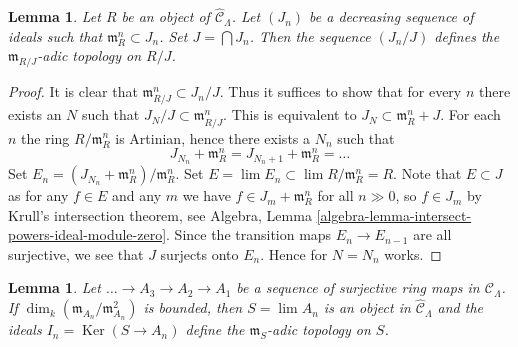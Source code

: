 \documentclass{stacks-project}
\theoremstyle{plain}
\newtheorem{lemma}[subsection]{Lemma}
\theoremstyle{definition}
\theoremstyle{remark}
\numberwithin{equation}{subsection}
\def\lim{\mathop{\mathrm{lim}}\nolimits}
\def\Ker{\mathop{\mathrm{Ker}}}
\begin{document}
\begin{lemma}
\label{lemma-m-adic-topology}
Let $R$ be an object of $\widehat{\mathcal{C}}_\Lambda$. Let $(J_n)$ be a
decreasing sequence of ideals such that $\mathfrak m_R^n \subset J_n$.
Set $J = \bigcap J_n$. Then the sequence $(J_n/J)$ defines the
$\mathfrak m_{R/J}$-adic topology on $R/J$.
\end{lemma}

\begin{proof}
It is clear that $\mathfrak m_{R/J}^n \subset J_n/J$. Thus it suffices
to show that for every $n$ there exists an $N$ such that
$J_N/J \subset \mathfrak m_{R/J}^n$. This is equivalent to
$J_N \subset \mathfrak m_R^n + J$. For each $n$ the ring $R/\mathfrak m_R^n$
is Artinian, hence there exists a $N_n$ such that
$$
J_{N_n} + \mathfrak m_R^n = J_{N_n + 1} + \mathfrak m_R^n = \ldots
$$
Set $E_n = (J_{N_n} + \mathfrak m_R^n)/\mathfrak m_R^n$.
Set $E = \lim E_n \subset \lim R/\mathfrak m_R^n = R$.
Note that $E \subset J$ as for any $f \in E$ and any $m$
we have $f \in J_m + \mathfrak m_R^n$ for all $n \gg 0$, so
$f \in J_m$ by Krull's intersection theorem, see
Algebra, Lemma \ref{algebra-lemma-intersect-powers-ideal-module-zero}.
Since the transition maps $E_n \to E_{n - 1}$ are all surjective,
we see that $J$ surjects onto $E_n$. Hence for $N = N_n$ works.
\end{proof}

\begin{lemma}
\label{lemma-limit-artinian}
Let $\ldots \to A_3 \to A_2 \to A_1$ be a sequence of surjective
ring maps in $\mathcal{C}_\Lambda$. If
$\dim_k (\mathfrak m_{A_n}/\mathfrak m_{A_n}^2)$ is bounded, then
$S = \lim A_n$ is an object in $\widehat{\mathcal{C}}_\Lambda$
and the ideals $I_n = \Ker(S \to A_n)$ define the
$\mathfrak m_S$-adic topology on $S$.
\end{lemma}
\end{document}
